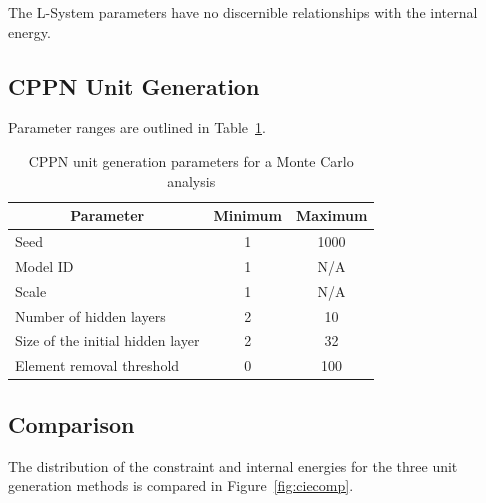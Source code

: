 The L-System parameters have no discernible relationships with the internal energy.

\subsection{CPPN Unit Generation}

Parameter ranges are outlined in Table~\ref{tab:cppnmc}.

\begin{table}[H]
\centering
\caption{CPPN unit generation parameters for a Monte Carlo analysis}
\label{tab:cppnmc}
\begin{tabular}{@{}lcc@{}}
\toprule
\multicolumn{1}{c}{\textbf{Parameter}} & \textbf{Minimum} & \textbf{Maximum} \\ \midrule
Seed                                   & 1                & 1000             \\
Model ID                               & 1                & N/A              \\
Scale                                  & 1                & N/A              \\
Number of hidden layers                & 2                & 10               \\
Size of the initial hidden layer       & 2                & 32               \\
Element removal threshold              & 0                & 100              \\ \bottomrule
\end{tabular}
\end{table}

\subsection{Comparison}

The distribution of the constraint and internal energies for the three unit generation methods is compared in Figure~\ref{fig:ciecomp}.

